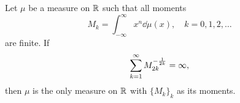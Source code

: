 \documentclass[main.tex]{subfiles}
\begin{document}
\begin{fact}\label{fact:carleman}
    Let $\mu$ be a measure on $\mathbb{R}$ such that all moments
    \[M_k = \int_{-\infty}^\infty x^n \dd \mu(x),\quad k=0,1,2,\ldots\]
    are finite.
    If
    \[\sum_{k=1}^\infty M_{2k}^{-\frac{1}{2k}} = \infty,\]
    then $\mu$ is the only measure on $\mathbb{R}$ with $\{M_k\}_k$ as its moments.
\end{fact}

    
\end{document}
